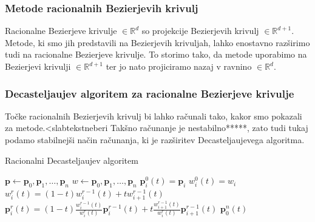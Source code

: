 \documentclass[isrm2, tisk]{fmfdelo}
\newcommand{\R}{\mathbb R}
\newcommand{\p}{\textbf{p}}
\begin{document}
    \subsubsection{Metode racionalnih Bezierjevih krivulj}
    Racionalne Bezierjeve krivulje $\in\R^d$ so projekcije Bezierjevih krivulj $\in\R^{d+1}$.
    Metode, ki smo jih predstavili na Bezierjevih krivuljah, lahko enostavno razširimo tudi na racionalne Bezierjeve krivulje.
    To storimo tako, da metode uporabimo na Bezierjevi krivulji $\in\R^{d+1}$ ter jo nato projiciramo nazaj v ravnino $\in\R^{d}$.

    \subsubsection{Decasteljaujev algoritem za racionalne Bezierjeve krivulje}
    Točke racionalnih Bezierjevih krivulj bi lahko računali tako, kakor smo pokazali za metode.<slabtekstneberi
    Takšno računanje je nestabilno*****, zato tudi tukaj podamo stabilnejši način računanja, ki je razširitev Decasteljaujevega algoritma.

    \begin{algorithm}[h!]
        \caption{Racionalni Decasteljaujev algoritem}
        \begin{algorithmic}
            \State $\p \gets \p_0,\p_1,\dots,\p_n$
            \State $w\gets \p_0,\p_1,\dots,\p_n$
                \State $\p_i^0(t)=\p_i$
                \State $w_i^0(t)=w_i$
            \EndFor
                    \State $w_i^r(t)=(1-t)w_{i}^{r-1}(t)+tw_{i+1}^{r-1}(t)$
                    \State $\p_i^r(t)=(1-t)\frac{w_{i}^{r-1}(t)}{w_{i}^{r}(t)}\p_i^{r-1}(t)+t\frac{w_{i+1}^{r-1}(t)}{w_{i}^{r}(t)}\p_{i+1}^{r-1}(t)$
                \EndFor
            \EndFor
            \State \Return $\p_0^n(t)$
        \end{algorithmic}\label{alg:racionalni-decasteljau}
    \end{algorithm}
\end{document}
